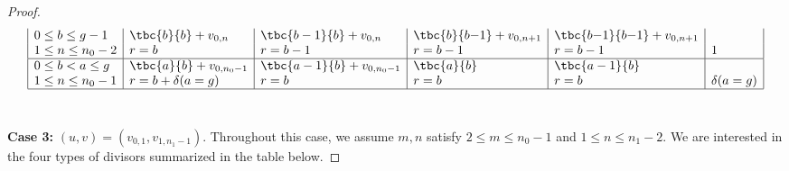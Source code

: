 \begin{proof}
{\[\begin{array}{|l|l|l|l|l|l|}
    0 \leq b \leq g-1
    & \tbc{b}{b} + v_{0,n} 
    & \tbc{b-1}{b} + v_{0,n}
    & \tbc{b}{b{-}1} + v_{0,n+1}
    & \tbc{b{-}1}{b{-}1} + v_{0,n+1}
    &
    \\
    1 \leq n \leq n_0-2
    & r = b
    & r = b-1
    & r = b-1
    & r = b-1
    & 1
    \\\hline

    0 \leq b < a \leq g
    & \tbc{a}{b} + v_{0,n_0-1}
    & \tbc{a-1}{b} + v_{0,n_0-1}
    & \tbc{a}{b}
    & \tbc{a-1}{b}
    &
    \\
    1 \leq n \leq n_0-1
    & r = b + \delta(a=g)
    & r = b
    & r = b
    & r = b
    & \delta(a=g)
    \\\hline
    \end{array}\]} \
    
    \noindent\textbf{Case 3:} $(u,v) = (v_{0,1},v_{1,n_1-1})$.
    Throughout this case, we assume $m,n$ satisfy $2 \leq m \leq n_0-1$ and $1 \leq n \leq n_1-2$.  We are interested in the four types of divisors summarized in the table below.
    

\end{proof}
